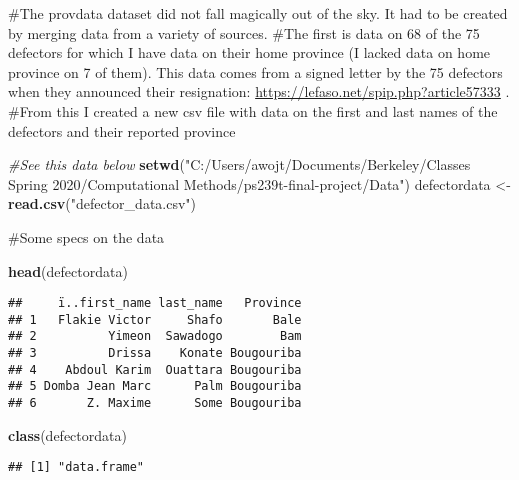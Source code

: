 \documentclass[]{article}
\newenvironment{Shaded}{\begin{snugshade}}{\end{snugshade}}
\newcommand{\CommentTok}[1]{\textcolor[rgb]{0.56,0.35,0.01}{\textit{#1}}}
\newcommand{\KeywordTok}[1]{\textcolor[rgb]{0.13,0.29,0.53}{\textbf{#1}}}
\newcommand{\NormalTok}[1]{#1}
\newcommand{\OperatorTok}[1]{\textcolor[rgb]{0.81,0.36,0.00}{\textbf{#1}}}
\newcommand{\StringTok}[1]{\textcolor[rgb]{0.31,0.60,0.02}{#1}}
\begin{document}
\#The provdata dataset did not fall magically out of the sky. It had to
be created by merging data from a variety of sources. \#The first is
data on 68 of the 75 defectors for which I have data on their home
province (I lacked data on home province on 7 of them). This data comes
from a signed letter by the 75 defectors when they announced their
resignation: \url{https://lefaso.net/spip.php?article57333} . \#From
this I created a new csv file with data on the first and last names of
the defectors and their reported province

\begin{Shaded}
\begin{Highlighting}[]
\CommentTok{\#See this data below}
\KeywordTok{setwd}\NormalTok{(}\StringTok{"C:/Users/awojt/Documents/Berkeley/Classes Spring 2020/Computational Methods/ps239t{-}final{-}project/Data"}\NormalTok{)}
\NormalTok{defectordata <{-}}\StringTok{ }\KeywordTok{read.csv}\NormalTok{(}\StringTok{"defector\_data.csv"}\NormalTok{)}
\end{Highlighting}
\end{Shaded}

\#Some specs on the data

\begin{Shaded}
\begin{Highlighting}[]
\KeywordTok{head}\NormalTok{(defectordata)}
\end{Highlighting}
\end{Shaded}

\begin{verbatim}
##     ï..first_name last_name   Province
## 1   Flakie Victor     Shafo       Bale
## 2          Yimeon  Sawadogo        Bam
## 3          Drissa    Konate Bougouriba
## 4    Abdoul Karim  Ouattara Bougouriba
## 5 Domba Jean Marc      Palm Bougouriba
## 6       Z. Maxime      Some Bougouriba
\end{verbatim}

\begin{Shaded}
\begin{Highlighting}[]
\KeywordTok{class}\NormalTok{(defectordata)}
\end{Highlighting}
\end{Shaded}

\begin{verbatim}
## [1] "data.frame"
\end{verbatim}

\begin{Shaded}
\end{Shaded}
\end{document}
